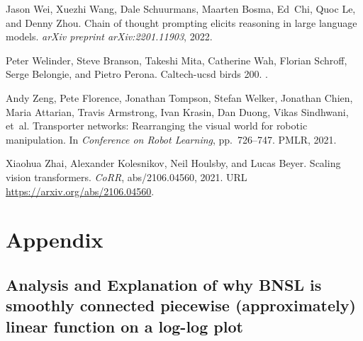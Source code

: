 \documentclass{article} %
\begin{document}
\begin{thebibliography}{44}
Jason Wei, Xuezhi Wang, Dale Schuurmans, Maarten Bosma, Ed~Chi, Quoc Le, and
  Denny Zhou.
\newblock Chain of thought prompting elicits reasoning in large language
  models.
\newblock \emph{arXiv preprint arXiv:2201.11903}, 2022{}.

Peter Welinder, Steve Branson, Takeshi Mita, Catherine Wah, Florian Schroff,
  Serge Belongie, and Pietro Perona.
\newblock Caltech-ucsd birds 200.
.

Andy Zeng, Pete Florence, Jonathan Tompson, Stefan Welker, Jonathan Chien,
  Maria Attarian, Travis Armstrong, Ivan Krasin, Dan Duong, Vikas Sindhwani,
  et~al.
\newblock Transporter networks: Rearranging the visual world for robotic
  manipulation.
\newblock In \emph{Conference on Robot Learning}, pp.\  726--747. PMLR, 2021.

Xiaohua Zhai, Alexander Kolesnikov, Neil Houlsby, and Lucas Beyer.
\newblock Scaling vision transformers.
\newblock \emph{CoRR}, abs/2106.04560, 2021.
\newblock URL \url{https://arxiv.org/abs/2106.04560}.

\end{thebibliography}


\fi

\clearpage 
\appendix
%
\section{Appendix}


\subsection{Analysis and Explanation of why BNSL is smoothly connected piecewise (approximately) linear function on a log-log plot}
\label{section:bnsl_analysis}
\end{document}
